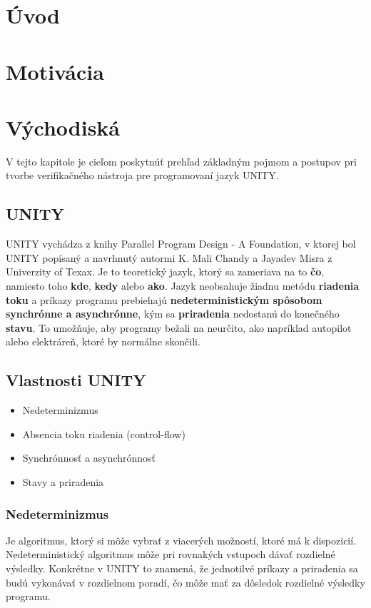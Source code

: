 \chapter{Úvod}\label{chap:intro}

\chapter{Motivácia}\label{chap:motivation}

\chapter{Východiská}\label{chap:intro}
V tejto kapitole je cieľom poskytnúť prehľad základným pojmom a postupov pri tvorbe verifikačného 
nástroja pre programovaní jazyk UNITY.

\section{UNITY}

UNITY vychádza z knihy Parallel Program Design - A Foundation, v ktorej bol UNITY popísaný a 
navrhnutý autormi K. Mali Chandy a Jayadev Misra z Univerzity of Texax. Je to teoretický jazyk, 
ktorý sa zameriava na to \textbf{čo}, namiesto toho \textbf{kde}, \textbf{kedy} alebo \textbf{ako}. 
Jazyk neobsahuje žiadnu metódu \textbf{riadenia toku} a príkazy programu prebiehajú 
\textbf{nedeterministickým spôsobom} \textbf{synchrónne a asynchrónne}, kým sa \textbf{priradenia} nedostanú do konečného \textbf{stavu}.
To umožňuje, aby programy bežali na neurčito, ako napríklad autopilot alebo elektráreň, ktoré by normálne skončili.

\section{Vlastnosti UNITY}

\begin{itemize}
	\item Nedeterminizmus
	\item Absencia toku riadenia (control-flow)
	\item Synchrónnosť a asynchrónnosť
	\item Stavy a priradenia
\end{itemize}


\subsection{Nedeterminizmus}
Je algoritmus, ktorý si môže vybrať z viacerých možností, ktoré má k dispozicií. Nedeterministický algoritmus 
môže pri rovnakých vstupoch dávať rozdielné výsledky. Konkrétne v UNITY to znamená, že jednotilvé príkazy a priradenia 
sa budú vykonávať v rozdielnom poradí, čo môže mať za dôsledok rozdielné výsledky programu.

